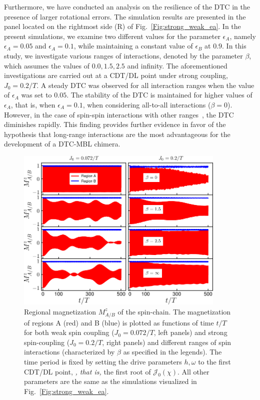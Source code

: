 \documentclass[12pt]{iopart}
\begin{document}
Furthermore, we have conducted an analysis on the resilience of the DTC in the presence of larger rotational errors. The simulation results are presented in the panel located on the rightmost side (R) of Fig.~\ref{Fig:strong_weak_ea}. In the present simulations, we examine two different values for the parameter $\epsilon_A$, namely $\epsilon_A = 0.05$ and $\epsilon_A = 0.1$, while maintaining a constant value of $\epsilon_B$ at $0.9$. In this study, we investigate various ranges of interactions, denoted by the parameter $\beta$, which assumes the values of $0.0, 1.5, 2.5$ and infinity. The aforementioned investigations are carried out at a CDT/DL point under strong coupling, $J_0 = 0.2/T$.  A steady DTC was observed for all interaction ranges when the value of $\epsilon_A$ was set to $0.05$. The stability of the DTC is maintained for higher values of $\epsilon_A$, that is, when $\epsilon_A = 0.1$, when considering all-to-all interactions ($\beta=0$). However, in the case of spin-spin interactions with other ranges , the DTC  diminishes rapidly. This finding provides further evidence in favor of the hypothesis that long-range interactions are the most advantageous for the development of a DTC-MBL chimera.
\begin{figure}
    \centering
    \includegraphics[width = 10cm]{clean_J_strong_MzAB_betas.pdf}
    \caption{Regional magnetization $M^z_{A/B}$ of the spin-chain. The magnetization of regions A (red) and B (blue) is plotted as functions of time $t/T$ for both weak spin coupling ($J_0=0.072/T$, left panels) and strong spin-coupling ($J_0=0.2/T$, right panels) and different ranges of spin interactions (characterized by $\beta$ as specified in the legends). The time period is fixed by setting the drive parameters $h,\omega$ to the first CDT/DL point, \textit{, that is,} the first root of $\mathcal{J}_0(\chi)$. All other parameters are the same as the simulations visualized in Fig.~\ref{Fig:strong_weak_ea}.}
    \label{Fig:regiogionalmag}
\end{figure}
\end{document}
